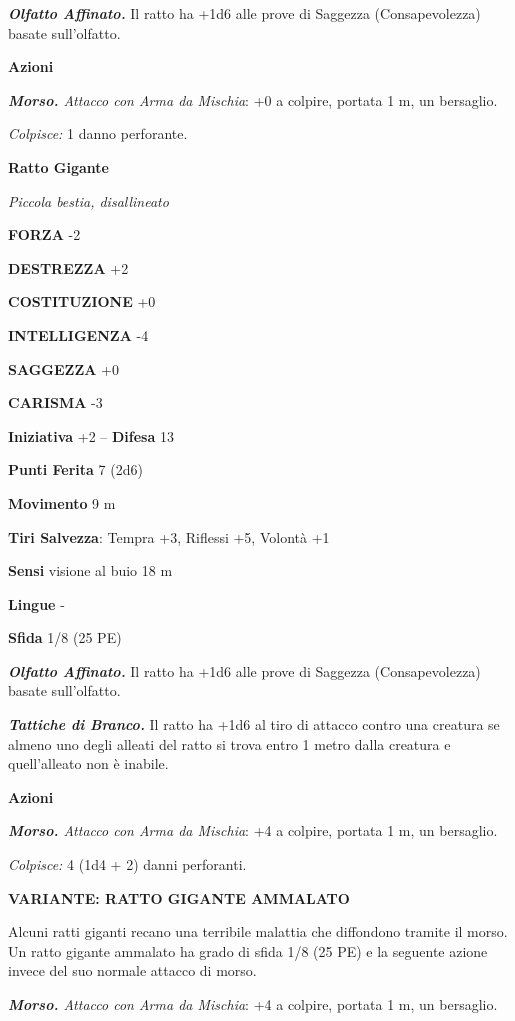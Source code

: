 \begin{multicols}{2}
\emph{\textbf{Olfatto Affinato.}} Il ratto ha +1d6 alle prove di Saggezza (Consapevolezza) basate sull'olfatto.

\textbf{Azioni}

\emph{\textbf{Morso.} Attacco con Arma da Mischia}: +0 a colpire, portata 1 m, un bersaglio.

\emph{Colpisce:} 1 danno perforante.

\medskip\textbf{Ratto Gigante}

\emph{Piccola bestia, disallineato}

\textbf{FORZA} -2

\textbf{DESTREZZA} +2

\textbf{COSTITUZIONE} +0

\textbf{INTELLIGENZA} -4

\textbf{SAGGEZZA} +0

\textbf{CARISMA} -3

\textbf{Iniziativa} +2 -- \textbf{Difesa} 13

\textbf{Punti Ferita} 7 (2d6)

\textbf{Movimento} 9 m

\textbf{Tiri Salvezza}: Tempra +3, Riflessi +5, Volontà +1 

\textbf{Sensi} visione al buio 18 m

\textbf{Lingue} -

\textbf{Sfida} 1/8 (25 PE)

\emph{\textbf{Olfatto Affinato.}} Il ratto ha +1d6 alle prove di Saggezza (Consapevolezza) basate sull'olfatto.

\emph{\textbf{Tattiche di Branco.}} Il ratto ha +1d6 al tiro di attacco contro una creatura se almeno uno degli alleati del ratto si trova entro 1 metro dalla creatura e quell'alleato non è inabile.

\textbf{Azioni}

\emph{\textbf{Morso.} Attacco con Arma da Mischia}: +4 a colpire, portata 1 m, un bersaglio.

\emph{Colpisce:} 4 (1d4 + 2) danni perforanti.

\textbf{VARIANTE: RATTO GIGANTE AMMALATO}

Alcuni ratti giganti recano una terribile malattia che diffondono tramite il morso. Un ratto gigante ammalato ha grado di sfida 1/8 (25 PE) e la seguente azione invece del suo normale attacco di morso.

\emph{\textbf{Morso.} Attacco con Arma da Mischia}: +4 a colpire, portata 1 m, un bersaglio.


\end{multicols}
